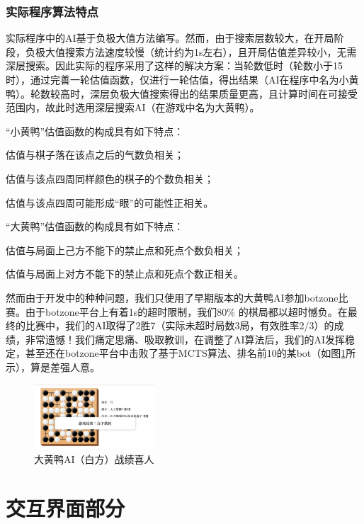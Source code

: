 \documentclass[twocolumn]{article}
\begin{document}
\section{实际程序算法特点}
实际程序中的AI基于负极大值方法编写。然而，由于搜索层数较大，在开局阶段，负极大值搜索方法速度较慢（统计约为1s左右），且开局估值差异较小，无需深层搜索。因此实际的程序采用了这样的解决方案：当轮数低时（轮数小于15时），通过完善一轮估值函数，仅进行一轮估值，得出结果（AI在程序中名为小黄鸭）。轮数较高时，深层负极大值搜索得出的结果质量更高，且计算时间在可接受范围内，故此时选用深层搜索AI（在游戏中名为大黄鸭）。
\par
“小黄鸭”估值函数的构成具有如下特点：
\begin{enumerate}
{\it
	\item {估值与棋子落在该点之后的气数负相关；}
	\item {估值与该点四周同样颜色的棋子的个数负相关；}
	\item {估值与该点四周可能形成“眼”的可能性正相关。}
}
\end{enumerate}
\par
“大黄鸭”估值函数的构成具有如下特点：
\begin{enumerate}
{\it
	\item 估值与局面上己方不能下的禁止点和死点个数负相关；
	\item 估值与局面上对方不能下的禁止点和死点个数正相关。
}
\end{enumerate}
\par 
然而由于开发中的种种问题，我们只使用了早期版本的大黄鸭AI参加botzone比赛。由于botzone平台上有着1s的超时限制，我们80\% 的棋局都以超时憾负。在最终的比赛中，我们的AI取得了2胜7（实际未超时局数3局，有效胜率2/3）的成绩，非常遗憾！我们痛定思痛、吸取教训，在调整了AI算法后，我们的AI发挥稳定，甚至还在botzone平台中击败了基于MCTS算法、排名前10的某bot（如图\ref{大黄鸭}所示），算是差强人意。
\begin{figure}[H]
\centering  %
\includegraphics[width=0.4\textwidth]{fig15}
\caption{大黄鸭AI（白方）战绩喜人}
\label{大黄鸭}
\end{figure}

\part{交互界面部分}
\end{document}
